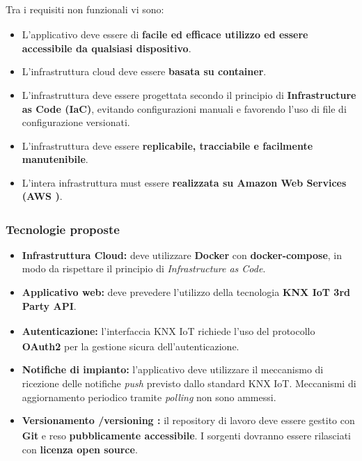 \documentclass[a4paper,11pt]{article}
\begin{document}
Tra i requisiti\textsubscript{}
 non funzionali\textsubscript{}
 vi sono:
\begin{itemize}
  \item L'applicativo deve essere di \textbf{facile ed efficace utilizzo ed essere accessibile da qualsiasi dispositivo}.
  \item L'infrastruttura cloud deve essere \textbf{basata su container}.
  \item L'infrastruttura deve essere progettata secondo il principio di \textbf{Infrastructure as Code (IaC)}, evitando configurazioni manuali e favorendo l'uso di file di configurazione versionati.
  \item L'infrastruttura deve essere \textbf{replicabile, tracciabile e facilmente manutenibile}.
  \item L'intera infrastruttura must essere \textbf{realizzata su Amazon Web Services (AWS\textsubscript{}
)}.
\end{itemize}

\subsubsection{Tecnologie proposte}
\begin{itemize}
 \item \textbf{Infrastruttura Cloud:} deve utilizzare \textbf{Docker} con \textbf{docker-compose}, in modo da rispettare il principio di \textit{Infrastructure as Code}.
 \item \textbf{Applicativo web:} deve prevedere l'utilizzo della tecnologia \textbf{KNX IoT 3rd Party API\textsubscript{}}.
 \item \textbf{Autenticazione:} l'interfaccia\textsubscript{} KNX IoT richiede l'uso del protocollo \textbf{OAuth2} per la gestione sicura dell'autenticazione.
 \item \textbf{Notifiche di impianto:} l'applicativo deve utilizzare il meccanismo di ricezione delle notifiche \textit{push} previsto dallo standard KNX IoT. 
 Meccanismi di aggiornamento periodico tramite \textit{polling} non sono ammessi.
 \item \textbf{Versionamento\textsubscript{}
/versioning\textsubscript{}
:} il repository\textsubscript{}
 di lavoro deve essere gestito con \textbf{Git} e reso \textbf{pubblicamente accessibile}. 
 I sorgenti dovranno essere rilasciati con \textbf{licenza open source}.
\end{itemize}
\end{document}
